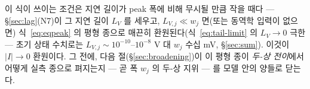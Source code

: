이 식이 쓰이는 조건은 지연 길이가 peak 폭에 비해 무시될 만큼 작을 때다 --- \S\ref{sec:lag}(N7)이 그 지연
길이 $L_V$ 를 세우고, $L_{V,j}\ll w_j$ 면(또는 동역학 입력이 없으면) 식~\eqref{eq:eqpeak} 의 평형 종으로
매끈히 환원된다(식~\eqref{eq:tail-limit} 의 $L_V\to0$ 극한 --- 초기 상태 수치로는 $L_{V,j}\sim10^{-10}$--$10^{-8}$ V
대 $w_j$ 수십 mV, \S\ref{sec:sum}). 이것이 $|I|\to0$ 환원이다.
그 전에, 다음 절(\S\ref{sec:broadening})이 이 평형 종이 \emph{두-상 전이}에서 어떻게 실측 종으로 펴지는지 ---
곧 폭 $w_j$ 의 두-상 지위 --- 를 모델 안의 양들로 닫는다.

